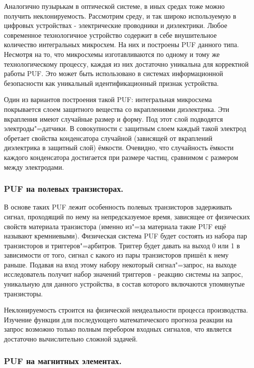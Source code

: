 Аналогично пузырькам в оптической системе, в иных средах тоже можно получить неклонируемость. Рассмотрим среду, и так широко используемую в цифровых устройствах - электрические проводники и диэлектрики.
Любое современное технологичное устройство содержит в себе внушительное количество интегральных микросхем. На них и построены PUF данного типа. Несмотря на то, что микросхемы изготавливаются по одному и тому же технологическому процессу, каждая из них достаточно уникальна для корректной работы PUF. Это может быть использовано в системах информационной безопасности как уникальный идентификационный признак устройства.

Один из вариантов построения такой PUF: интегральная микросхема покрывается слоем защитного вещества со вкраплениями диэлектрика. Эти вкрапления имеют случайные размер и форму. Под этот слой подводятся электроды"=датчики. В совокупности с защитным слоем каждый такой электрод обретает свойства конденсатора случайной (зависящей от вкраплений диэлектрика в защитный слой) ёмкости. Очевидно, что случайность ёмкости каждого конденсатора достигается при размере частиц, сравнимом с размером между электродами.


\subsubsection{PUF на полевых транзисторах. }
\label{sub:domain:puf_physical_types:transistors}

В основе таких PUF лежит особенность полевых транзисторов задерживать сигнал, проходящий по нему на непредсказуемое время, зависящее от физических свойств материала транзистора (именно из"=за материала такие PUF ещё называют кремниевыми). Физическая система PUF будет состоять из набора пар транзисторов и триггеров"=арбитров. Триггер будет давать на выход 0 или 1 в зависимости от того, сигнал с какого из пары транзисторов пришёл к нему раньше. Подавая на вход этому набору некоторый сигнал"=запрос, на выходе исследователь получит набор значений триггеров - реакцию системы на запрос, уникальную для данного устройства, в состав которого включаются упомянутые транзисторы.

Неклонируемость строится на физической неидеальности процесса производства. Изучение функции для последующего математического прогноза реакции на запрос возможно только полным перебором входных сигналов, что является достаточно вычислительно сложной задачей.


\subsubsection{PUF на магнитных элементах. }
\label{sub:domain:puf_physical_types:magnetic}

